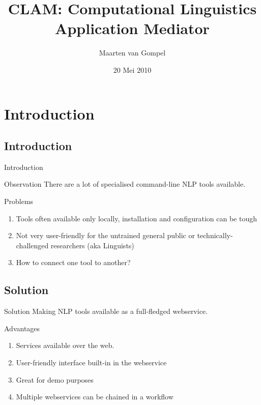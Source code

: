 \documentclass[compress]{beamer}
\title{CLAM: Computational Linguistics Application Mediator}
\author{Maarten van Gompel}
\date{20 Mei 2010}
\begin{document}
\begin{frame}
	\titlepage\smallraccoon\ilkuvt
\end{frame}

\section{Introduction}

\subsection{Introduction}
\begin{frame}{Introduction}

    \begin{block}{Observation}
        There are a lot of specialised command-line NLP tools available.
    \end{block}

    \begin{block}{Problems}
        \begin{enumerate}
            \item Tools often available only locally, installation and configuration can be tough
            \item Not very user-friendly for the untrained general public or technically-challenged researchers (aka Linguists)
            \item How to connect one tool to another?
        \end{enumerate}
    \end{block}
\end{frame}


\subsection{Solution}
\begin{frame}
    \begin{block}{Solution} 
        Making NLP tools available as a full-fledged webservice.
    \end{block}

    \begin{block}{Advantages}

        \begin{enumerate}
            \item Services available over the web.
            \item User-friendly interface built-in in the webservice
            \item Great for demo purposes
            \item Multiple webservices can be chained in a workflow
        \end{enumerate}

    \end{block}
\end{frame}
\end{document}
